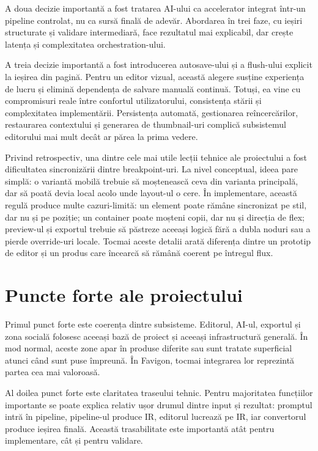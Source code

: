 A doua decizie importantă a fost tratarea AI-ului ca accelerator integrat într-un pipeline controlat, nu ca sursă finală de adevăr. Abordarea în trei faze, cu ieșiri structurate și validare intermediară, face rezultatul mai explicabil, dar crește latența și complexitatea orchestration-ului.

A treia decizie importantă a fost introducerea autosave-ului și a flush-ului explicit la ieșirea din pagină. Pentru un editor vizual, această alegere susține experiența de lucru și elimină dependența de salvare manuală continuă. Totuși, ea vine cu compromisuri reale între confortul utilizatorului, consistența stării și complexitatea implementării. Persistența automată, gestionarea reîncercărilor, restaurarea contextului și generarea de thumbnail-uri complică subsistemul editorului mai mult decât ar părea la prima vedere.

Privind retrospectiv, una dintre cele mai utile lecții tehnice ale proiectului a fost dificultatea sincronizării dintre breakpoint-uri. La nivel conceptual, ideea pare simplă: o variantă mobilă trebuie să moștenească ceva din varianta principală, dar să poată devia local acolo unde layout-ul o cere. În implementare, această regulă produce multe cazuri-limită: un element poate rămâne sincronizat pe stil, dar nu și pe poziție; un container poate moșteni copii, dar nu și direcția de flex; preview-ul și exportul trebuie să păstreze aceeași logică fără a dubla noduri sau a pierde override-uri locale. Tocmai aceste detalii arată diferența dintre un prototip de editor și un produs care încearcă să rămână coerent pe întregul flux.

\section{Puncte forte ale proiectului}

Primul punct forte este coerența dintre subsisteme. Editorul, AI-ul, exportul și zona socială folosesc aceeași bază de proiect și aceeași infrastructură generală. În mod normal, aceste zone apar în produse diferite sau sunt tratate superficial atunci când sunt puse împreună. În Favigon, tocmai integrarea lor reprezintă partea cea mai valoroasă.

Al doilea punct forte este claritatea traseului tehnic. Pentru majoritatea funcțiilor importante se poate explica relativ ușor drumul dintre input și rezultat: promptul intră în pipeline, pipeline-ul produce IR, editorul lucrează pe IR, iar convertorul produce ieșirea finală. Această trasabilitate este importantă atât pentru implementare, cât și pentru validare.

